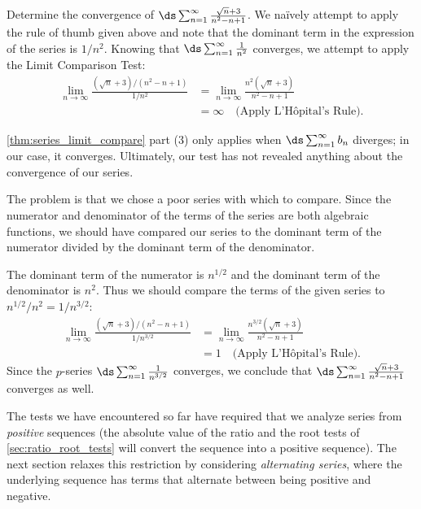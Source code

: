\begin{example}\label{ex_lct3}%
Determine the convergence of $\ds\sum_{n=1}^\infty \frac{\sqrt{n}+3}{n^2-n+1}$.
\solution
We naïvely attempt to apply the rule of thumb given above and note that the dominant term in the expression of the series is $1/n^2$. Knowing that $\ds \sum_{n=1}^\infty \frac1{n^2}$ converges, we attempt to apply the Limit Comparison Test:
\begin{align*}
	\lim_{n\to\infty}\frac{(\sqrt{n}+3)/(n^2-n+1)}{1/n^2}
	&=\lim_{n\to\infty}\frac{n^2(\sqrt n+3)}{n^2-n+1}\\
	&= \infty \quad \text{(Apply L'Hôpital's Rule)}.
\end{align*}

\autoref{thm:series_limit_compare} part (3) only applies when $\ds\sum_{n=1}^\infty b_n$ diverges; in our case, it converges. Ultimately, our test has not revealed anything about the convergence of our series.

The problem is that we chose a poor series with which to compare. Since the numerator and denominator of the terms of the series are both algebraic functions, we should have compared our series  to the dominant term of the numerator divided by the dominant term of the denominator.

The dominant term of the numerator is $n^{1/2}$ and the dominant term of the denominator is $n^2$. Thus we should compare the terms of the given series to $n^{1/2}/n^2 = 1/n^{3/2}$:
\begin{align*}
\lim_{n\to\infty}\frac{(\sqrt{n}+3)/(n^2-n+1)}{1/n^{3/2}} &= \lim_{n\to \infty} \frac{n^{3/2}(\sqrt n+3)}{n^2-n+1} \\
		&= 1\quad \text{(Apply L'Hôpital's Rule)}.
\end{align*}
Since the  $p$-series $\ds\sum_{n=1}^\infty \frac1{n^{3/2}}$ converges, we conclude that $\ds\sum_{n=1}^\infty \frac{\sqrt{n}+3}{n^2-n+1}$ converges as well.
\end{example}

The tests we have encountered so far have required that we analyze series from \emph{positive} sequences (the absolute value of the ratio and the root tests of \autoref{sec:ratio_root_tests} will convert the sequence into a positive sequence). The next section relaxes this restriction by  considering \emph{alternating series}, where the underlying sequence has terms that alternate between being positive and negative.

